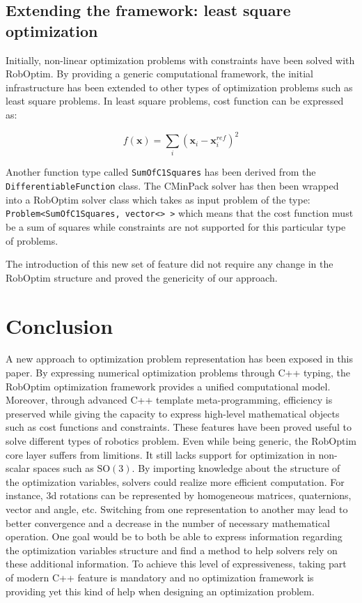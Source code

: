 \documentclass[conference,final,a4paper,twocolumn,9pt]{IEEEtran}
\begin{document}
\subsection{Extending the framework: least square optimization}


Initially, non-linear optimization problems with constraints have been
solved with RobOptim. By providing a generic computational framework,
the initial infrastructure has been extended to other types of
optimization problems such as least square problems. In least square
problems, cost function can be expressed as:

\begin{equation}
  f(\mathbf{x}) = \sum_i (\mathbf{x}_i - \mathbf{x}^{ref}_i)^2
\end{equation}


Another function type called \texttt{SumOfC1Squares} has been derived
from the \texttt{DifferentiableFunction} class. The CMinPack solver
has then been wrapped into a RobOptim solver class which takes as
input problem of the type: \texttt{Problem<SumOfC1Squares, vector<> >}
which means that the cost function must be a sum of squares while
constraints are not supported for this particular type of problems.

The introduction of this new set of feature did not require any change
in the RobOptim structure and proved the genericity of our approach.


\section{Conclusion}\label{sec:conclusion}


A new approach to optimization problem representation has been exposed
in this paper. By expressing numerical optimization problems through
C++ typing, the RobOptim optimization framework provides a unified
computational model. Moreover, through advanced C++ template
meta-programming, efficiency is preserved while giving the capacity to
express high-level mathematical objects such as cost functions and
constraints. These features have been proved useful to solve different
types of robotics problem. Even while being generic, the RobOptim core
layer suffers from limitions. It still lacks support for optimization
in non-scalar spaces such as $\text{SO}(3)$. By importing knowledge
about the structure of the optimization variables, solvers could
realize more efficient computation. For instance, 3d rotations can be
represented by homogeneous matrices, quaternions, vector and angle,
etc. Switching from one representation to another may lead to better
convergence and a decrease in the number of necessary mathematical
operation. One goal would be to both be able to express information
regarding the optimization variables structure and find a method to
help solvers rely on these additional information. To achieve this
level of expressiveness, taking part of modern C++ feature is
mandatory and no optimization framework is providing yet this kind of
help when designing an optimization problem.
\end{document}
